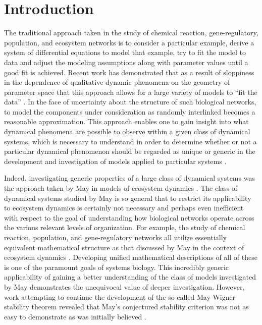 \documentclass{amsart}
\theoremstyle{definition}
\theoremstyle{remark}
\numberwithin{equation}{section}
\begin{document}
\maketitle

\section{Introduction}

The traditional approach taken in the study of chemical reaction, gene-regulatory, population, and ecosystem networks is to consider a particular example, derive a system of differential equations to model that example, try to fit the model to data and adjust the modeling assumptions along with parameter values until a good fit is achieved. Recent work has demonstrated that as a result of sloppiness in the dependence of qualitative dynamic phenomena on the geometry of parameter space that this approach allows for a large variety of models to ``fit the data'' \cite{Brown2003,Gutenkunst2007,Daniels2008a,Machta2013,Hines2014,Prabakaran2014}. In the face of uncertainty about the structure of such biological networks, to model the components under consideration as randomly interlinked becomes a reasonable approximation. This approach enables one to gain insight into what dynamical phenomena are possible to observe within a given class of dynamical systems, which is necessary to understand in order to determine whether or not a particular dynamical phenomenon should be regarded as unique or generic in the development and investigation of models applied to particular systems \cite{Gunawardena2013,Gunawardena2014}.

Indeed, investigating generic properties of a large class of dynamical systems was the approach taken by May in models of ecosystem dynamics \cite{Gardner1970,May1972}. The class of dynamical systems studied by May is so general that to restrict its applicability to ecosystem dynamics is certainly not necessary and perhaps even inefficient with respect to the goal of understanding how biological networks operate across the various relevant levels of organization. For example, the study of chemical reaction, population, and gene-regulatory networks all utilize essentially equivalent mathematical structure as that discussed by May in the context of ecosystem dynamics \cite{RossCr2003,Alon2006,Palsson2006,HamidBolouri2008,Palsson2011a,Voit2012,Sauro2012}. Developing unified mathematical descriptions of all of these is one of the paramount goals of systems biology. This incredibly generic applicability of gaining a better understanding of the class of models investigated by May demonstrates the unequivocal value of deeper investigation.  However, work attempting to continue the development of the so-called May-Wigner stability theorem revealed that May's conjectured stability criterion was not as easy to demonstrate as was initially believed \cite{Cohen1984,May1972a,Radius2014}.
\end{document}
